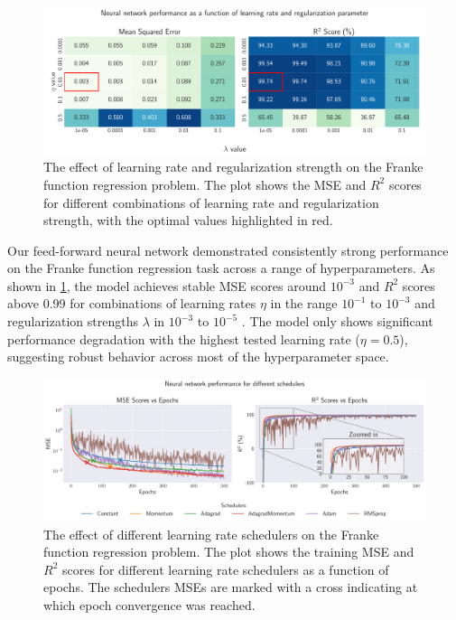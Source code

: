 \clearpage

\onecolumngrid
\begin{figure}[h!]
    \begin{minipage}{\textwidth}
        \centering
        \includegraphics[width = .9\textwidth]{../figs/c_eta_lambda.pdf}
        \caption{The effect of learning rate and regularization strength on the Franke function regression problem. The plot shows the MSE and \( R^2 \) scores for different combinations of learning rate and regularization strength, with the optimal values highlighted in red.}
        \label{fig:NN_Franke_eta_lambda}
    \end{minipage}
\end{figure}
\twocolumngrid

Our feed-forward neural network demonstrated consistently strong performance on the Franke function regression task across a range of hyperparameters. As shown in \cref{fig:NN_Franke_eta_lambda}, the model achieves stable MSE scores around $10^{-3}$ and $R^2$ scores above 0.99 for combinations of learning rates $ \eta $ in the range $ 10^{-1} $ to $ 10^{-3}$ and regularization strengths $ \lambda $ in $ 10^{-3} $ to $ 10^{-5}$ . The model only shows significant performance degradation with the highest tested learning rate ($\eta = 0.5$), suggesting robust behavior across most of the hyperparameter space.

\onecolumngrid
\begin{figure}[h!]
    \begin{minipage}{\textwidth}
        \centering
        \includegraphics[width = .9\textwidth]{../figs/b_schedulers.pdf}
        \caption{The effect of different learning rate schedulers on the Franke function regression problem. The plot shows the training MSE and \( R^2 \) scores for different learning rate schedulers as a function of epochs. The schedulers MSEs are marked with a cross indicating at which epoch convergence was reached.}
        \label{fig:NN_Franke_schedulers}
    \end{minipage}
\end{figure}
\twocolumngrid

